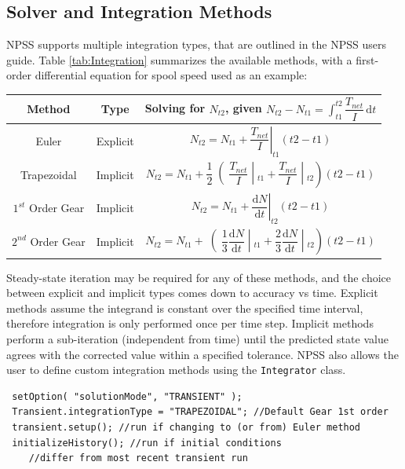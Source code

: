 \documentclass[heading.tex]{subfiles}
\begin{document}
\subsection{Solver and Integration Methods}
NPSS supports multiple integration types, that are outlined in the NPSS users guide.
\cite[chap.~7.1]{NPSS} Table \ref{tab:Integration} summarizes the available methods, with a 
first-order differential equation for spool speed used as an example: 

\begin{minipage}{\linewidth}
\centering
\bigskip
{} \label{tab:Integration}
\begin{tabular}{|c|c|c|}
\hline 
Method & Type & Solving for  $N_{t2}$, given  $N_{t2}- N_{t1}= \int_{t1}^{t2} \! \dfrac{T_{net}}{I} \, \mathrm{d}t $\\ 
\hline 
Euler & Explicit & $ \left.N_{t2}= N_{t1} + \dfrac{T_{net}}{I} \right|_{t1}^{}(t2-t1)$ \\ 
\hline 
Trapezoidal & Implicit & $ \left.N_{t2}= N_{t1} + \dfrac{1}{2}\middle(\dfrac{T_{net}}{I} \middle|_{t1}^{}+\dfrac{T_{net}}{I} \middle|_{t2}^{}\right)(t2-t1)$ \\ 
\hline 
$1^{st}$ Order Gear & Implicit & $ \left.N_{t2}= N_{t1} + \dfrac{ \mathrm{d}N }{ \mathrm{d}t } \right|_{t2}^{}(t2-t1)$ \\ 
\hline 
$2^{nd}$ Order Gear & Implicit & $ \left.N_{t2}= N_{t1} + \middle(\dfrac{1}{3}\dfrac{ \mathrm{d}N }{ \mathrm{d}t }\middle|_{t1}^{}+\dfrac{2}{3}\dfrac{ \mathrm{d}N }{ \mathrm{d}t }\middle|_{t2}^{}\right)(t2-t1)$ \\ 
\hline 
\end{tabular} 
\end{minipage}

Steady-state iteration may be required for any of these methods, and the choice between explicit
and implicit types comes down to accuracy vs time. Explicit methods assume the integrand is
constant over the specified time interval, therefore integration is only performed once per time
step. Implicit methods perform a sub-iteration (independent from time) until the predicted state
value agrees with the corrected value within a specified tolerance. NPSS also allows the user to
define custom integration methods using the \texttt{Integrator} class. \cite[chap.~15.2]{NPSS}  

\begin{adjustwidth}{-0.5cm}{-0.5cm}
 \begin{verbatim}
 setOption( "solutionMode", "TRANSIENT" );
 Transient.integrationType = "TRAPEZOIDAL"; //Default Gear 1st order
 transient.setup(); //run if changing to (or from) Euler method
 initializeHistory(); //run if initial conditions 
 	//differ from most recent transient run
 \end{verbatim}
 \end{adjustwidth} 
       
\end{document}
